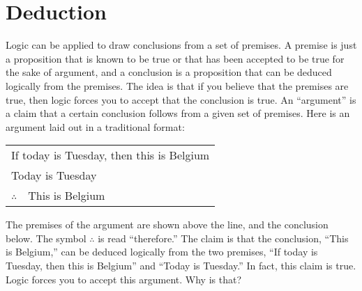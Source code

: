 \section{Deduction}\label{S-logic-5}


\newcommand{\argument}[2]{
  \begin{tabular}[t]{@{\ }l@{\ }}
   #1\\
   \hline
   $\therefore$\ \ #2\\
  \end{tabular}
}


Logic can be applied to draw conclusions from a set of premises.
A premise is just a proposition that is known to be true or that
has been accepted to be true for the sake of argument, and a conclusion
is a proposition that can be deduced logically from the premises.
The idea is that if you believe that the premises are true,
then logic forces you to accept that the conclusion is true.
An ``argument'' is a claim that a certain conclusion follows from
a given set of premises.  Here is an argument laid out in
a traditional format:
\begin{center}
\argument{If today is Tuesday, then this is Belgium\\Today is Tuesday}{This is Belgium}
\end{center}
The premises of the argument are shown above the line, and the conclusion
below.  The symbol $\therefore$ is read ``therefore.''  The claim is that
the conclusion, ``This is Belgium,'' can be deduced logically from the two
premises, ``If today is Tuesday, then this is Belgium'' and ``Today is Tuesday.''
In fact, this claim is true.  Logic forces you to accept this argument.
Why is that?

